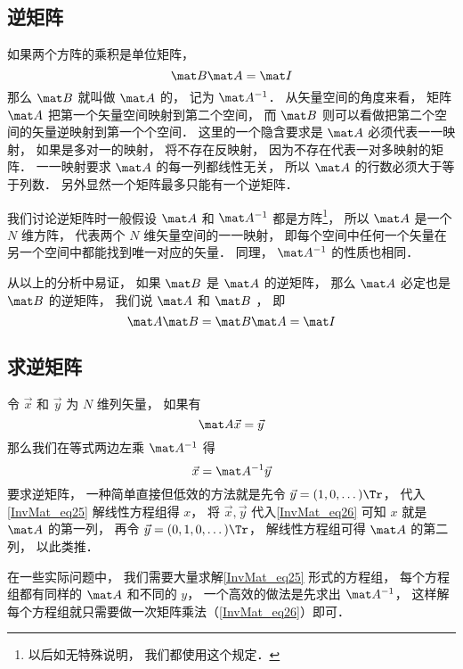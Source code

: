 
\subsection{逆矩阵}

如果两个方阵的乘积是单位矩阵， 
\begin{equation}
\mat B \mat A = \mat I
\end{equation}
那么 $\mat B$ 就叫做 $\mat A$ 的， 记为 $\mat A^{-1}$． 从矢量空间的角度来看， 矩阵 $\mat A$ 把第一个矢量空间映射到第二个空间， 而 $\mat B$ 则可以看做把第二个空间的矢量逆映射到第一个个空间． 这里的一个隐含要求是 $\mat A$ 必须代表一一映射， 如果是多对一的映射， 将不存在反映射， 因为不存在代表一对多映射的矩阵． 一一映射要求 $\mat A$ 的每一列都线性无关，%
所以 $\mat A$ 的行数必须大于等于列数． 另外显然一个矩阵最多只能有一个逆矩阵．

我们讨论逆矩阵时一般假设 $\mat A$ 和 $\mat A^{-1}$ 都是方阵\footnote{以后如无特殊说明， 我们都使用这个规定．}， 所以 $\mat A$ 是一个 $N$ 维方阵， 代表两个 $N$ 维矢量空间的一一映射， 即每个空间中任何一个矢量在另一个空间中都能找到唯一对应的矢量． 同理， $\mat A^{-1}$ 的性质也相同．

从以上的分析中易证， 如果 $\mat B$ 是 $\mat A$ 的逆矩阵， 那么 $\mat A$ 必定也是 $\mat B$ 的逆矩阵， 我们说 $\mat A$ 和 $\mat B$ ， 即
\begin{equation}\label{InvMat_eq2}
\mat A \mat B = \mat B \mat A = \mat I
\end{equation}

\subsection{求逆矩阵}
令 $\vec x$ 和 $\vec y$ 为 $N$ 维列矢量， 如果有
\begin{equation}\label{InvMat_eq25}
\mat A \vec x = \vec y
\end{equation}
那么我们在等式两边左乘 $\mat A^{-1}$ 得
\begin{equation}\label{InvMat_eq26}
\vec x = \mat A^{-1} \vec y
\end{equation}
要求逆矩阵， 一种简单直接但低效的方法就是先令 $\vec y = (1, 0, \dots)\Tr$， 代入\autoref{InvMat_eq25} 解线性方程组得 $x$， 将 $\vec x, \vec y$ 代入\autoref{InvMat_eq26} 可知 $x$ 就是 $\mat A$ 的第一列， 再令 $\vec y = (0, 1, 0, \dots)\Tr$， 解线性方程组可得 $\mat A$ 的第二列， 以此类推．

在一些实际问题中， 我们需要大量求解\autoref{InvMat_eq25} 形式的方程组， 每个方程组都有同样的 $\mat A$ 和不同的 $y$， 一个高效的做法是先求出 $\mat A^{-1}$， 这样解每个方程组就只需要做一次矩阵乘法（\autoref{InvMat_eq26}）即可．




